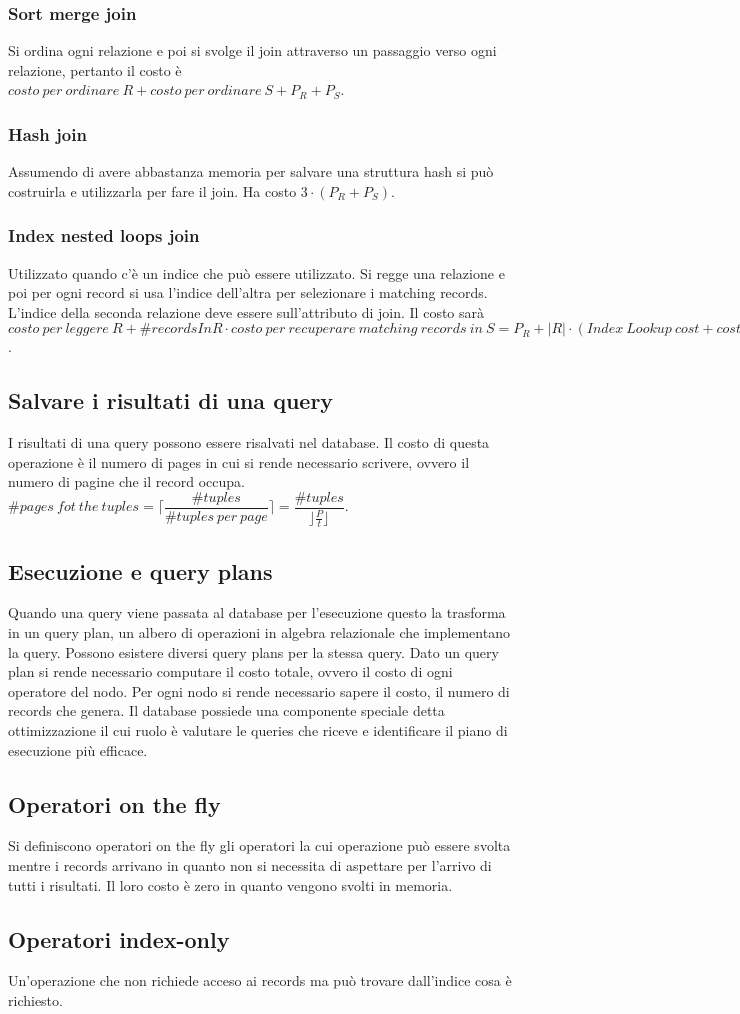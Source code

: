 \subsubsection{Sort merge join}
Si ordina ogni relazione e poi si svolge il join attraverso un passaggio verso ogni relazione, pertanto il costo \`e $costo\ per\ ordinare\ R+costo\ per\ ordinare\ S+P_R+P_S$. 
\subsubsection{Hash join}
Assumendo di avere abbastanza memoria per salvare una struttura hash si pu\`o costruirla e utilizzarla per fare il join. Ha costo $3\cdot(P_R+P_S)$. 
\subsubsection{Index nested loops join}
Utilizzato quando c'\`e un indice che pu\`o essere utilizzato. Si regge una relazione e poi per ogni record si usa l'indice dell'altra per selezionare i matching records. L'indice della seconda relazione deve essere
sull'attributo di join. Il costo sar\`a $costo\ per\ leggere\ R+\# recordsInR\cdot costo\ per\ recuperare\ matching\ records\ in\ S=P_R+|R|\cdot(Index\ Lookup\ cost+cost\ of\ retrieving\ qualifying\ records)$. 
\subsection{Salvare i risultati di una query}
I risultati di una query possono essere risalvati nel database. Il costo di questa operazione \`e il numero di pages in cui si rende necessario scrivere, ovvero il numero di pagine che il record occupa. 
$\# pages\ fot\ the\ tuples=\lceil\dfrac{\# tuples}{\# tuples\ per\ page}\rceil=\dfrac{\# tuples}{\rfloor\frac{P}{t}\rfloor}$. 
\subsection{Esecuzione e  query plans}
Quando una query viene passata al database per l'esecuzione questo la trasforma in un query plan, un albero di operazioni in algebra relazionale che implementano la query. Possono esistere diversi query plans
per la stessa query. Dato un query plan si rende necessario computare il costo totale, ovvero il costo di ogni operatore del nodo. Per ogni nodo si rende necessario sapere il costo, il numero di records che genera. 
Il database possiede una componente speciale detta ottimizzazione il cui ruolo \`e valutare le queries che riceve e identificare il piano di esecuzione pi\`u efficace. 
\subsection{Operatori on the fly}
Si definiscono operatori on the fly gli operatori la cui operazione pu\`o essere svolta mentre i records arrivano in quanto non si necessita di aspettare per l'arrivo di tutti i risultati. Il loro costo \`e zero in quanto
vengono svolti in memoria. 
\subsection{Operatori index-only}
Un'operazione che non richiede acceso ai records ma pu\`o trovare dall'indice cosa \`e richiesto.